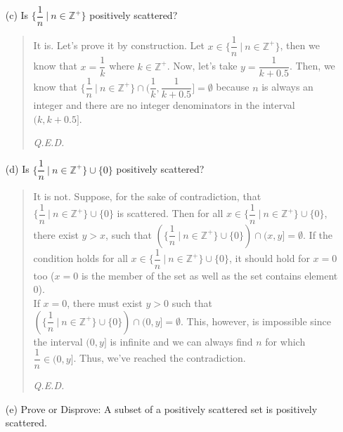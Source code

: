 \documentclass[12pt, a4paper]{article}                      %
\begin{document}
\begin{itemize}
\begin{itemize}
\item[]

\item[(c)]
Is $\{\dfrac{1}{n} \ | \ n \in \mathbb{Z}^+\}$ positively scattered?
\begin{quote}
It is. Let's prove it by construction. Let $x \in \{\dfrac{1}{n} \ | \ n \in \mathbb{Z}^+\}$, then
we know that $x = \dfrac{1}{k}$ where $k \in \mathbb{Z}^+$. Now, let's take $y = \dfrac{1}{k + 0.5}$.
Then, we know that $\{\dfrac{1}{n} \ | \ n \in \mathbb{Z}^+\} \cap (\dfrac{1}{k}, \dfrac{1}{k + 0.5}] = \emptyset$
because $n$ is always an integer and there are no integer denominators in the interval $(k, k + 0.5]$.
\begin{flushright}
\textit{Q.E.D.}
\end{flushright}
\end{quote}

\item[]

\item[(d)]
Is $\{\dfrac{1}{n} \ | \ n \in \mathbb{Z}^+\} \cup \{0\}$ positively scattered? 
\begin{quote}
It is not. Suppose, for the sake of contradiction, that $\{\dfrac{1}{n} \ | \ n \in \mathbb{Z}^+\} \cup \{0\}$
is scattered. Then for all $x \in \{\dfrac{1}{n} \ | \ n \in \mathbb{Z}^+\} \cup \{0\}$, there exist
$y > x$, such that $(\{\dfrac{1}{n} \ | \ n \in \mathbb{Z}^+\} \cup \{0\}) \cap (x,y] = \emptyset$.
If the condition holds for all $x \in \{\dfrac{1}{n} \ | \ n \in \mathbb{Z}^+\} \cup \{0\}$, it should hold
for $x = 0$ too ($x = 0$ is the member of the set as well as the set contains element 0).\\
If $x = 0$, there must exist $y > 0$ such that $(\{\dfrac{1}{n} \ | \ n \in \mathbb{Z}^+\} \cup \{0\}) \cap (0,y] = \emptyset$.
This, however, is impossible since the interval $(0, y]$ is infinite and we can always find $n$ for which
$\dfrac{1}{n} \in (0, y]$. Thus, we've reached the contradiction.
\begin{flushright}
\textit{Q.E.D.}
\end{flushright}
\end{quote}

\item[]

\item[(e)]
Prove or Disprove: A subset of a positively scattered set is positively scattered.
\begin{quote}

\end{quote}
\end{itemize}



\end{itemize} 
\end{document}
